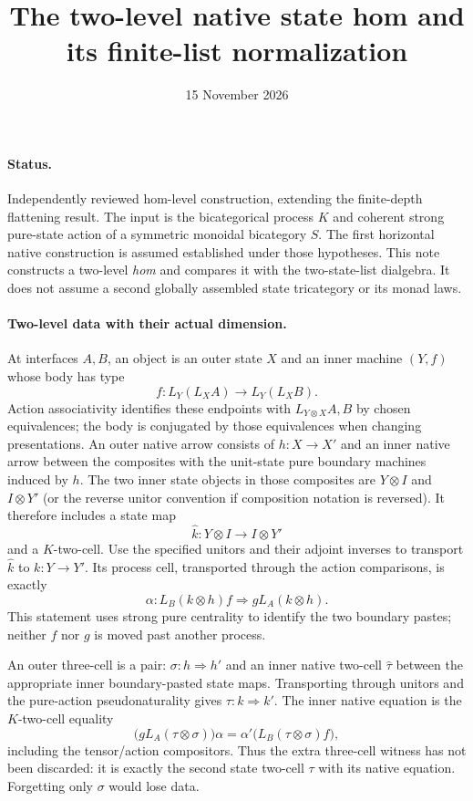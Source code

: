 \documentclass{article}
\title{The two-level native state hom and its finite-list normalization}
\date{15 November 2026}
\begin{document}
\maketitle
\paragraph{Status.} Independently reviewed hom-level construction, extending the finite-depth flattening result. The input is the bicategorical process $K$ and coherent strong pure-state action of a symmetric monoidal bicategory $S$. The first horizontal native construction is assumed established under those hypotheses. This note constructs a two-level \emph{hom} and compares it with the two-state-list dialgebra. It does not assume a second globally assembled state tricategory or its monad laws.

\paragraph{Two-level data with their actual dimension.} At interfaces $A,B$, an object is an outer state $X$ and an inner machine $(Y,f)$ whose body has type
\[
 f:L_Y(L_XA)\longrightarrow L_Y(L_XB).
\]
Action associativity identifies these endpoints with $L_{Y\otimes X}A,B$ by chosen equivalences; the body is conjugated by those equivalences when changing presentations. An outer native arrow consists of $h:X\to X'$ and an inner native arrow between the composites with the unit-state pure boundary machines induced by $h$. The two inner state objects in those composites are $Y\otimes I$ and $I\otimes Y'$ (or the reverse unitor convention if composition notation is reversed). It therefore includes a state map
\[
 \widehat k:Y\otimes I\longrightarrow I\otimes Y'
\]
and a $K$-two-cell. Use the specified unitors and their adjoint inverses to transport $\widehat k$ to $k:Y\to Y'$. Its process cell, transported through the action comparisons, is exactly
\[
 \alpha:L_B(k\otimes h)f\Longrightarrow gL_A(k\otimes h).
\]
This statement uses strong pure centrality to identify the two boundary pastes; neither $f$ nor $g$ is moved past another process.

An outer three-cell is a pair: $\sigma:h\Rightarrow h'$ and an inner native two-cell $\widehat\tau$ between the appropriate inner boundary-pasted state maps. Transporting through unitors and the pure-action pseudonaturality gives $\tau:k\Rightarrow k'$. The inner native equation is the $K$-two-cell equality
\[
 \bigl(gL_A(\tau\otimes\sigma)\bigr)\alpha
 =\alpha'\bigl(L_B(\tau\otimes\sigma)f\bigr),
\]
including the tensor/action compositors. Thus the extra three-cell witness has not been discarded: it is exactly the second state two-cell $\tau$ with its native equation. Forgetting only $\sigma$ would lose data.
\end{document}
